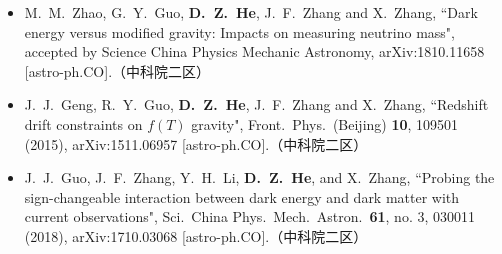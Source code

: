 \begin{itemize}[leftmargin=*]
    \item  M.~M.~Zhao, G.~Y.~Guo, \textbf{D.~Z.~He}, J.~F.~Zhang and X.~Zhang, ``Dark energy versus modified gravity: Impacts on measuring neutrino mass", accepted by Science China Physics Mechanic Astronomy, arXiv:1810.11658 [astro-ph.CO].（中科院二区）
 
    \item J.~J.~Geng, R.~Y.~Guo, \textbf{D.~Z.~He}, J.~F.~Zhang and X.~Zhang, ``Redshift drift constraints on $f(T)$ gravity", Front.\ Phys.\ (Beijing) {\bf 10}, 109501      (2015), arXiv:1511.06957 [astro-ph.CO].（中科院二区）
  
    \item J.~J.~Guo, J.~F.~Zhang, Y.~H.~Li, \textbf{D.~Z.~He}, and X.~Zhang, ``Probing the sign-changeable interaction between dark energy and dark matter with current observations", Sci.\ China Phys.\ Mech.\ Astron.\ {\bf 61}, no. 3, 030011 (2018), arXiv:1710.03068 [astro-ph.CO].（中科院二区）
    
  \end{itemize}